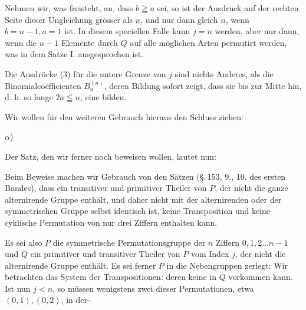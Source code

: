 Nehmen wir, was freisteht, an, dass $b \geqq a$ sei, so ist der
Ausdruck auf der rechten Seite dieser Ungleichung grösser
als $n$, und nur dann gleich $n$, wenn $b = n - 1, a = 1$ ist. In
diesem speciellen Falle kann $j = n$ werden, aber nur dann,
wenn die $n - 1$ Elemente durch $Q$ auf alle möglichen Arten
permutirt werden, was in dem Satze I. ausgesprochen ist.

Die Ausdrücke (3) für die untere Grenze von $j$ sind nichts
Anderes, als die Binomialco\"efficienten $B_a^{(n)}$, deren Bildung
sofort zeigt, dass sie bis zur Mitte hin, d. h. so lange $2a \leqq n$,
eine  bilden.

Wir wollen für den weiteren Gebrauch hieraus den Schluss
ziehen:

$\alpha$) 

Der Satz, den wir ferner noch beweisen wollen, lautet nun:


Beim Beweise machen wir Gebrauch von den Sätzen (\S.\,153,
9., 10. des ersten Bandes), dass ein transitiver und primitiver
Theiler von $P$, der nicht die ganze alternirende Gruppe enthält,
und daher nicht mit der alternirenden oder der symmetrischen
Gruppe selbst identisch ist, keine Transposition und keine
cyklische Permutation von nur drei Ziffern enthalten kann.

Es sei also $P$ die symmetrische Permutationsgruppe der
$n$ Ziffern $0, 1, 2 \dots n - 1$ und $Q$ ein primitiver und transitiver
Theiler von $P$ vom Index $j$, der nicht die alternirende Gruppe
enthält. Es sei ferner $P$ in die Nebengruppen zerlegt:
Wir betrachten das System der Transpositionen:
deren keine in $Q$ vorkommen kann. Ist nun $j < n$, so müssen
wenigstens zwei dieser Permutationen, etwa $(0,1), (0,2)$, in der-
